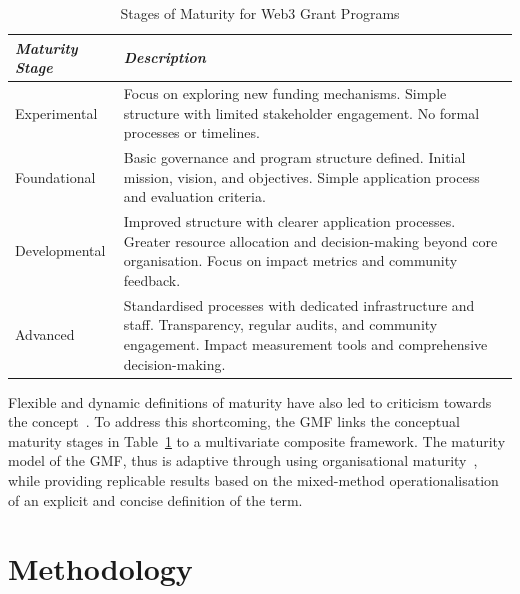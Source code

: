 \documentclass[conference]{IEEEtran}
\begin{document}
\begin{table}[htbp]
\caption{Stages of Maturity for Web3 Grant Programs}
\begin{center}
\footnotesize
\begin{tabular}{p{2cm}p{6cm}}
\hline
\textbf{\textit{Maturity Stage}} & \textbf{\textit{Description}} \\
\hline
Experimental & Focus on exploring new funding mechanisms. Simple structure with limited stakeholder engagement. No formal processes or timelines. \\
\hline
Foundational & Basic governance and program structure defined. Initial mission, vision, and objectives. Simple application process and evaluation criteria. \\
\hline
Developmental & Improved structure with clearer application processes. Greater resource allocation and decision-making beyond core organisation. Focus on impact metrics and community feedback. \\
\hline
Advanced & Standardised processes with dedicated infrastructure and staff. Transparency, regular audits, and community engagement. Impact measurement tools and comprehensive decision-making. \\
\hline
\end{tabular}
\end{center}
\label{tab:grant_maturity}
\end{table}

Flexible and dynamic definitions of maturity have also led to criticism towards the concept~\cite[p.~8]{pereira_review_2020}. To address this shortcoming, the GMF links the conceptual maturity stages in Table~\ref{tab:grant_maturity} to a multivariate composite framework. The maturity model of the GMF, thus is adaptive through using organisational maturity~\cite{andersen_e-government_2006,johansson_roadmap_2019}, while providing replicable results based on the mixed-method operationalisation of an explicit and concise definition of the term.

\section{Methodology}\label{sec_3}
\end{document}
